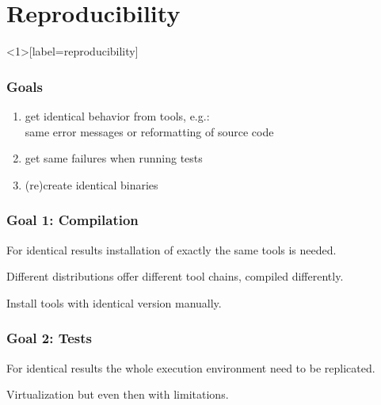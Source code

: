 \section{Reproducibility}

\begin{frame}<1>[label=reproducibility]
	\frametitle{Goals}

	\begin{enumerate}[<+-| alert@+>]

	\item get identical behavior from tools, e.g.: \\ same error messages or reformatting of source code
	\item get same failures when running tests
	\item (re)create identical binaries
	\end{enumerate}
\end{frame}

\begin{frame}
	\frametitle{Goal 1: Compilation}

	For identical results installation of exactly the same tools is needed.

	\pause

	\begin{problem}
	Different distributions offer different tool chains, compiled differently.
	\end{problem}

	\vspace{1cm}
	\pause

	\begin{solution}
	Install tools with identical version manually.
	\end{solution}
\end{frame}

\begin{frame}
	\frametitle{Goal 2: Tests}

	\begin{problem}
	For identical results the whole execution environment need to be replicated.
	\end{problem}

	\vspace{1cm}
	\pause

	\begin{solution}
	Virtualization but even then with limitations.
	\end{solution}
\end{frame}


